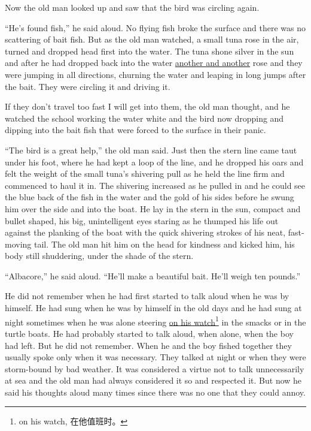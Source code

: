 \documentclass[fontset=ubuntu,zihao=-4]{ctexrep}
\newlength{\drop}%
\begin{document}
Now the old man looked up and saw that the bird was circling again.

``He's found fish,'' he said aloud. No flying fish broke the surface and there
was no \gls{scattering} of bait fish. But as the old man watched, a small tuna
rose in the air, turned and dropped head first into the water. The tuna
\gls{shone} \gls{silver} in the sun and after he had dropped back into the water
\uline{another and another} rose and they were jumping in all \glspl{direction},
\gls{churning} the water and \gls{leaping} in long jumps after the bait. They
were circling it and driving it.

If they don't travel too fast I will get into them, the old man thought, and
he watched the school working the water white and the bird now dropping and
dipping into the bait fish that were forced to the surface in their \gls{panic}.

``The bird is a great help,'' the old man said. Just then the stern line
came \gls{taut} under his foot, where he had kept a loop of the line, and he
dropped his oars and felt the weight of the small tuna's shivering
\gls{pull} as he held the line firm and \gls{commenced} to \gls{haul} it in.
The shivering increased as he pulled in and he could see the blue back of
the fish in the water and the gold of his sides before he swung him over the
side and into the boat. He lay in the stern in the sun, \gls{compact} and
\gls{bullet} shaped, his big, \gls{unintelligent} eyes staring as he
\gls{thumped} his life out against the \gls{planking} of the boat with the
quick shivering \glspl{stroke} of his \gls{neat}, fast-moving tail. The old
man hit him on the head for \gls{kindness} and kicked him, his body still
\gls{shuddering}, under the shade of the stern.

``Albacore,'' he said aloud. ``He'll make a beautiful bait. He'll weigh ten pounds.''

He did not remember when he had first started to talk aloud when he was by
himself. He had \gls{sung} when he was by himself in the old days and he had
sung at night sometimes when he was alone steering \uline{on his
  watch}\footnote{on his watch, 在他值班时。} in the \glspl{smack} or in the
turtle boats. He had probably started to talk aloud, when alone, when the
boy had left. But he did not remember. When he and the boy fished together
they usually spoke only when it was necessary. They talked at night or when
they were \gls{storm-bound} by bad weather. It was \gls{considered} a
\gls{virtue} not to talk unnecessarily at sea and the old man had always
considered it so and respected it. But now he said his thoughts \gls{aloud}
many times since there was no one that they could \gls{annoy}.
\end{document}
